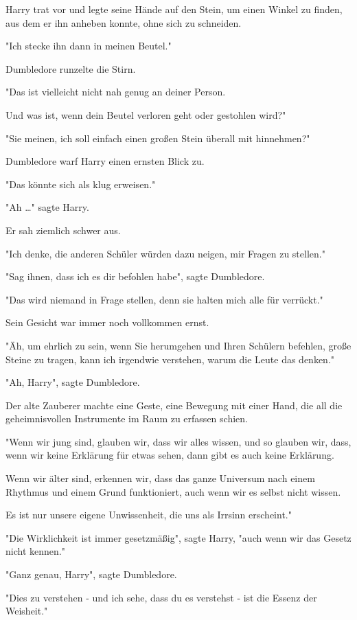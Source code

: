 {Harry trat vor und legte seine Hände auf den Stein, um einen Winkel zu finden, aus dem er ihn anheben konnte, ohne sich zu schneiden.

"Ich stecke ihn dann in meinen Beutel."

Dumbledore runzelte die Stirn.

"Das ist vielleicht nicht nah genug an deiner Person.

Und was ist, wenn dein Beutel verloren geht oder gestohlen wird?"

"Sie meinen, ich soll einfach einen großen Stein überall mit hinnehmen?"

Dumbledore warf Harry einen ernsten Blick zu.

"Das könnte sich als klug erweisen."

"Ah …" sagte Harry.

Er sah ziemlich schwer aus.

"Ich denke, die anderen Schüler würden dazu neigen, mir Fragen zu stellen."

"Sag ihnen, dass ich es dir befohlen habe", sagte Dumbledore.

"Das wird niemand in Frage stellen, denn sie halten mich alle für verrückt."

Sein Gesicht war immer noch vollkommen ernst.

"Äh, um ehrlich zu sein, wenn Sie herumgehen und Ihren Schülern befehlen, große Steine zu tragen, kann ich irgendwie verstehen, warum die Leute das denken."

"Ah, Harry", sagte Dumbledore.

Der alte Zauberer machte eine Geste, eine Bewegung mit einer Hand, die all die geheimnisvollen Instrumente im Raum zu erfassen schien.

"Wenn wir jung sind, glauben wir, dass wir alles wissen, und so glauben wir, dass, wenn wir keine Erklärung für etwas sehen, dann gibt es auch keine Erklärung.

Wenn wir älter sind, erkennen wir, dass das ganze Universum nach einem Rhythmus und einem Grund funktioniert, auch wenn wir es selbst nicht wissen.

Es ist nur unsere eigene Unwissenheit, die uns als Irrsinn erscheint."

"Die Wirklichkeit ist immer gesetzmäßig", sagte Harry, "auch wenn wir das Gesetz nicht kennen."

"Ganz genau, Harry", sagte Dumbledore.

"Dies zu verstehen - und ich sehe, dass du es verstehst - ist die Essenz der Weisheit."

}
